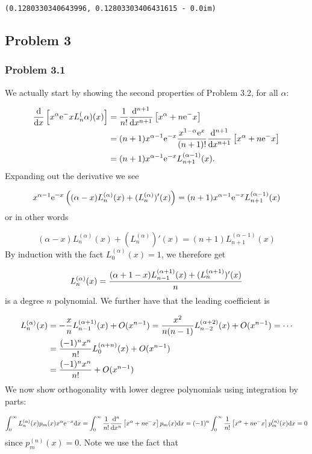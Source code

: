 \documentclass[12pt,a4paper]{article}
\def\D{ {\rm d} }
\def\E{ {\rm e} }
\def\addtab#1={#1\;&=}
\def\ccr{\\\addtab}
\def\dx{\D x}
\def\pr(#1){\left({#1}\right)}
\def\br[#1]{\left[{#1}\right]}
\def\addtab#1={#1\;&=}
\def\ccr{\\\addtab}
\begin{document}
\begin{lstlisting}
(0.1280330340643996, 0.12803303406431615 - 0.0im)
\end{lstlisting}


\subsection{Problem 3}
\subsubsection{Problem 3.1}
We actually start by showing the second properties of Problem 3.2, for all $\alpha$:


\begin{align*}
{\D \over \dx} \br[x^\alpha \E^{-x} L_n^{(\alpha)}(x)] &= {1 \over n!}  {\D^{n+1} \over \dx^{n+1}}\br[x^{\alpha+n}\E^{-x}] \ccr
= (n+1)x^{\alpha-1}\E^{-x}  {x^{1-\alpha} \E^{x} \over (n+1)!}{ \D^{n+1} \over \dx^{n+1}}\br[x^{\alpha+n}\E^{-x}] \ccr
= (n+1) x^{\alpha-1}\E^{-x} L_{n+1}^{(\alpha-1)}(x).
\end{align*}
Expanding out the derivative we see

\[
x^{\alpha-1} \E^{-x}\pr({(\alpha -x)L_n^{(\alpha)}(x) + (L_n^{(\alpha)})'(x)}) = (n+1) x^{\alpha-1}\E^{-x} L_{n+1}^{(\alpha-1)}(x)
\]
or in other words

\[
(\alpha -x)L_n^{(\alpha)}(x) + (L_n^{(\alpha)})'(x) = (n+1) L_{n+1}^{(\alpha-1)}(x)
\]
By induction with the fact $L_0^{(\alpha)}(x) = 1$, we therefore get

\[
L_n^{(\alpha)}(x) = {(\alpha+1 -x)L_{n-1}^{(\alpha+1)}(x) + (L_n^{(\alpha+1)})'(x) \over n}
\]
is a degree $n$ polynomial. We further have that the leading coefficient is


\begin{align*}
L_n^{(\alpha)}(x) &= -{x \over n} L_{n-1}^{(\alpha+1)}(x) +O(x^{n-1}) =   {x^2 \over n(n-1)} L_{n-2}^{(\alpha+2)}(x) +O(x^{n-1}) = \cdots \ccr
= {(-1)^n x^n \over n!} L_0^{(\alpha+n)}(x) +O(x^{n-1}) \\
&= {(-1)^n x^n \over n!} +O(x^{n-1})
\end{align*}
We now show orthogonality with lower degree polynomials using integration by parts:

\[
\int_0^\infty L_n^{(\alpha)}(x) p_m(x) x^\alpha \E^{-x} \dx =
\int_0^\infty  {1 \over n!} {\D^n \over \dx^n}\br[x^{\alpha+n}\E^{-x}]  p_m(x)  \dx = (-1)^n \int_0^\infty  {1 \over n!} \br[x^{\alpha+n}\E^{-x}]  p_m^{(n)}(x)  \dx = 0
\]
since $p_m^{(n)}(x) = 0$. Note we use the fact that
\end{document}

